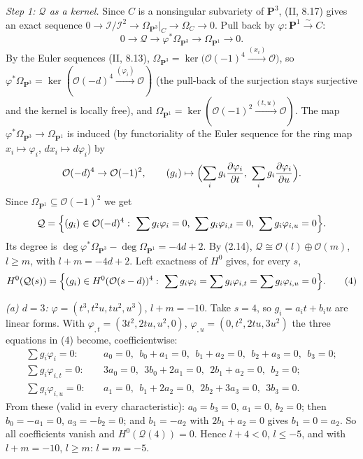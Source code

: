 \documentclass[11pt]{article}
\begin{document}
\emph{Step 1: $\mathcal Q$ as a kernel.} Since $C$ is a nonsingular subvariety of $\mathbf P^3$, (II, 8.17) gives an exact sequence $0\to\mathcal I/\mathcal I^2\to\Omega_{\mathbf P^3}|_C\to\Omega_C\to0$. Pull back by $\varphi\colon\mathbf P^1\xrightarrow{\sim}C$:
\[ 0\to\mathcal Q\to\varphi^*\Omega_{\mathbf P^3}\to\Omega_{\mathbf P^1}\to0 . \]
By the Euler sequences (II, 8.13), $\Omega_{\mathbf P^3}=\ker\bigl(\mathcal O(-1)^4\xrightarrow{(x_i)}\mathcal O\bigr)$, so $\varphi^*\Omega_{\mathbf P^3}=\ker(\mathcal O(-d)^4\xrightarrow{(\varphi_i)}\mathcal O)$ (the pull-back of the surjection stays surjective and the kernel is locally free), and $\Omega_{\mathbf P^1}=\ker(\mathcal O(-1)^2\xrightarrow{(t,u)}\mathcal O)$. The map $\varphi^*\Omega_{\mathbf P^3}\to\Omega_{\mathbf P^1}$ is induced (by functoriality of the Euler sequence for the ring map $x_i\mapsto\varphi_i$, $dx_i\mapsto d\varphi_i$) by
\[ \mathcal O(-d)^4\to\mathcal O(-1)^2,\qquad (g_i)\mapsto\Bigl(\sum_ig_i\frac{\partial\varphi_i}{\partial t},\ \sum_ig_i\frac{\partial\varphi_i}{\partial u}\Bigr). \]
Since $\Omega_{\mathbf P^1}\subseteq\mathcal O(-1)^2$ we get
\[ \mathcal Q=\Bigl\{(g_i)\in\mathcal O(-d)^4:\ \sum g_i\varphi_i=0,\ \sum g_i\varphi_{i,t}=0,\ \sum g_i\varphi_{i,u}=0\Bigr\} . \]
Its degree is $\deg\varphi^*\Omega_{\mathbf P^3}-\deg\Omega_{\mathbf P^1}=-4d+2$. By (2.14), $\mathcal Q\cong\mathcal O(l)\oplus\mathcal O(m)$, $l\ge m$, with $l+m=-4d+2$. Left exactness of $H^0$ gives, for every $s$,
\[ H^0(\mathcal Q(s))=\Bigl\{(g_i)\in H^0(\mathcal O(s-d))^4:\ \sum g_i\varphi_i=\sum g_i\varphi_{i,t}=\sum g_i\varphi_{i,u}=0\Bigr\}.\tag{4} \]

\emph{(a) $d=3$:} $\varphi=(t^3,t^2u,tu^2,u^3)$, $l+m=-10$. Take $s=4$, so $g_i=a_it+b_iu$ are linear forms. With $\varphi_{,t}=(3t^2,2tu,u^2,0)$, $\varphi_{,u}=(0,t^2,2tu,3u^2)$ the three equations in (4) become, coefficientwise:
\begin{align*}
\textstyle\sum g_i\varphi_i=0:&\quad a_0=0,\ \ b_0+a_1=0,\ \ b_1+a_2=0,\ \ b_2+a_3=0,\ \ b_3=0;\\
\textstyle\sum g_i\varphi_{i,t}=0:&\quad 3a_0=0,\ \ 3b_0+2a_1=0,\ \ 2b_1+a_2=0,\ \ b_2=0;\\
\textstyle\sum g_i\varphi_{i,u}=0:&\quad a_1=0,\ \ b_1+2a_2=0,\ \ 2b_2+3a_3=0,\ \ 3b_3=0 .
\end{align*}
From these (valid in every characteristic): $a_0=b_3=0$, $a_1=0$, $b_2=0$; then $b_0=-a_1=0$, $a_3=-b_2=0$; and $b_1=-a_2$ with $2b_1+a_2=0$ gives $b_1=0=a_2$. So all coefficients vanish and $H^0(\mathcal Q(4))=0$. Hence $l+4<0$, $l\le-5$, and with $l+m=-10$, $l\ge m$: $l=m=-5$.
\end{document}
